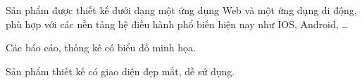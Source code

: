 \documentclass[./../main_file.tex]{subfiles}
\begin{document}
	Sản phẩm được thiết kế dưới dạng một ứng dụng Web và một ứng dụng di động, phù hợp với các nền tảng hệ điều hành phổ biến hiện nay như IOS, Android, …
	
	Các báo cáo, thống kê có biểu đồ minh họa.
	
	Sản phẩm thiết kế có giao diện đẹp mắt, dễ sử dụng.
	
\end{document}
